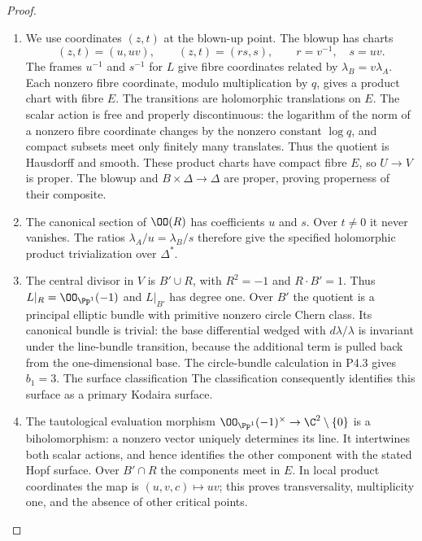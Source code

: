 \begin{proof}

\begin{enumerate}[label={$\langle1\rangle$\arabic*.},leftmargin=*]
\item We use coordinates $(z,t)$ at the blown-up point. The blowup has charts
\[
 (z,t)=(u,uv),\qquad (z,t)=(rs,s),\qquad r=v^{-1},\quad s=uv.
\]
The frames $u^{-1}$ and $s^{-1}$ for $L$ give fibre coordinates related by
$\lambda_B=v\lambda_A$. Each nonzero fibre coordinate, modulo multiplication
by $q$, gives a product chart with fibre $E$. The transitions are holomorphic
translations on $E$. The scalar action is free and properly discontinuous:
the logarithm of the norm of a nonzero fibre coordinate changes by the
nonzero constant $\log q$, and compact subsets meet only finitely many
translates. Thus the quotient is Hausdorff and smooth. These product charts
have compact fibre $E$, so $U\to V$ is proper. The blowup and $B\times\Delta
\to\Delta$ are proper, proving properness of their composite.

\item The canonical section of $\OO(R)$ has coefficients $u$ and $s$. Over
$t\ne0$ it never vanishes. The ratios $\lambda_A/u=\lambda_B/s$ therefore
give the specified holomorphic product trivialization over $\Delta^*$.

\item The central divisor in $V$ is $B'\cup R$, with $R^2=-1$ and $R\cdot B'=1$.
Thus $L|_R=\OO_{\Pp^1}(-1)$ and $L|_{B'}$ has degree one. Over $B'$ the
quotient is a principal elliptic bundle with primitive nonzero circle Chern
class. Its canonical bundle is trivial: the base differential wedged with
$d\lambda/\lambda$ is invariant under the line-bundle transition, because
the additional term is pulled back from the one-dimensional base. The
circle-bundle calculation in P4.3 gives $b_1=3$. The surface classification
The classification \cite[Chapter~VI, Theorem~1.1 and Table~10, pp.~243--244]{BHPV2004E} consequently identifies this surface as
a primary Kodaira surface.

\item The tautological evaluation morphism
$\OO_{\Pp^1}(-1)^\times\to\C^2\setminus\{0\}$ is a biholomorphism: a
nonzero vector uniquely determines its line. It intertwines both scalar
actions, and hence identifies the other component with the stated Hopf
surface. Over $B'\cap R$ the components meet in $E$. In local product
coordinates the map is $(u,v,c)\mapsto uv$; this proves transversality,
multiplicity one, and the absence of other critical points.

\end{enumerate}
\end{proof}
